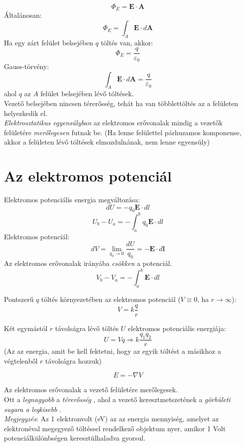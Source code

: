 \documentclass[12pt,a4paper,twocolumn]{article}
\begin{document}
  \[\Phi_E = \mathbf{E}\cdot \mathbf{A}\]
  Általánosan:
  \[\Phi_E = \int_{A} \mathbf{E}\cdot d\mathbf{A}\]
  Ha egy zárt felület belsejében $q$ töltés van, akkor:
  \[\Phi_E = \frac{q}{\varepsilon_0}\]
  Gauss-törvény:
  \[\int_{A} \mathbf{E}\cdot d\mathbf{A} = \frac{q}{\varepsilon_0}\]
  ahol $q$ az $A$ felület belsejében lévő töltések.\\

  Vezető belsejében nincsen térerősség, tehát ha van többlettöltés az a felületen helyezkedik el.\\

  \textit{Elektrosztatikus egyensúlyban} az elektromos erővonalak mindig a vezetők felületére \textit{merőlegesen} futnak be. (Ha lenne
  felülettel párhuzamos komponense, akkor a felületen lévő töltések elmozdulnának, nem lenne egyensúly)
  
  \section{Az elektromos potenciál}
  
  Elektromos potenciális energia megváltozása:
  \[dU = - q_0 \mathbf{E} \cdot dl\]
  \[U_b - U_a = - \int_{a}^b q_0 \mathbf{E} \cdot dl\]
  Elektromos potenciál:
  \[dV = \lim_{q_0\to 0} \frac{dU}{q_0} = - \mathbf{E} \cdot d\mathbf{l}\]
  Az elektromos erővonalak irányába \textit{csökken} a potenciál.
  \[V_b - V_a = - \int_{a}^b \mathbf{E} \cdot dl\]
  
  Pontszerű $q$ töltés környezetében az elektromos potenciál ($V \equiv 0$, ha $r \to \infty$):
  \[V = k\frac{q}{r}\]
  
  Két egymástól $r$ távolságra lévő töltés $U$ elektromos potenciális energiája:
  \[U = Vq \Rightarrow k\frac{q_1 q_2}{r}\]
  (Az az energia, amit be kell fektetni, hogy az egyik töltést a másikhoz a végtelenből $r$ távolságra hozzuk)
  
  \[E = -\nabla V\]
  
  Az elektromos erővonalak a vezető felületére merőlegesek.\\
  Ott a \textit{ legnagyobb } a \textit{ térerősség }, ahol a vezető keresztmetszetének a \textit{ görbületi sugara a legkisebb }.\\

  \textit{Megjegyzés}: Az 1 elektronvolt (eV) az az energia mennyiség, amelyet az elektronéval
  megegyező töltéssel rendelkező objektum nyer, amikor 1 Volt potenciálkülönbségen keresztülhaladva gyorsul.\\
\end{document}
